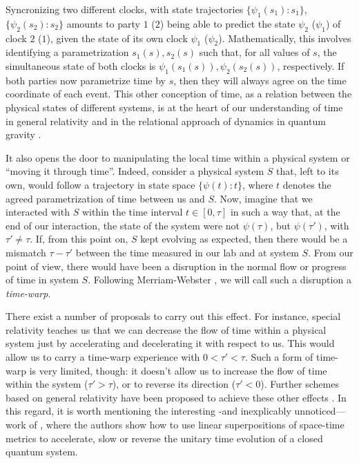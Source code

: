 \documentclass[twocolumn,prx,aps,longbibliography]{revtex4-1}
\begin{document}
Syncronizing two different clocks, with state trajectories $\{\psi_1(s_1):s_1\}$, $\{\psi_2(s_2):s_2\}$ amounts to party $1$ ($2$) being able to predict the state $\psi_2$ ($\psi_1$) of clock $2$ ($1$), given the state of its own clock $\psi_1$ ($\psi_2$). Mathematically, this involves identifying a parametrization $s_1(s),s_2(s)$ such that, for all values of $s$, the simultaneous state of both clocks is $\psi_1(s_1(s)),\psi_2(s_2(s))$, respectively. If both parties now parametrize time by $s$, then they will always agree on the time coordinate of each event. This other conception of time, as a relation between the physical states of different systems, is at the heart of our understanding of time in general relativity and in the relational approach of dynamics in quantum gravity \cite{rovelli}. 

It also opens the door to manipulating the local time within a physical system or ``moving it through time''. Indeed, consider a physical system $S$ that, left to its own, would follow a trajectory in state space $\{\psi(t):t\}$, where $t$ denotes the agreed parametrization of time between us and $S$. Now, imagine that we interacted with $S$ within the time interval $t\in [0, \tau]$ in such a way that, at the end of our interaction, the state of the system were not $\psi(\tau)$, but $\psi(\tau')$, with $\tau'\not=\tau$. If, from this point on, $S$ kept evolving as expected, then there would be a mismatch $\tau-\tau'$ between the time measured in our lab and at system $S$. From our point of view, there would have been a disruption in the normal flow or progress of time in system $S$. Following Merriam-Webster \cite{merriam}, we will call such a disruption a \emph{time-warp}.


There exist a number of proposals to carry out this effect. For instance, special relativity teaches us that we can decrease the flow of time within a physical system just by accelerating and decelerating it with respect to us. This would allow us to carry a time-warp experience with $0<\tau'<\tau$. Such a form of time-warp is very limited, though: it doesn't allow us to increase the flow of time within the system ($\tau'>\tau$), or to reverse its direction ($\tau'<0$). Further schemes based on general relativity have been proposed to achieve these other effects \cite{goedel,thorne}. In this regard, it is worth mentioning the interesting -and inexplicably unnoticed--- work of \cite{sandu}, where the authors show how to use linear superpositions of space-time metrics to accelerate, slow or reverse the unitary time evolution of a closed quantum system.
\end{document}
